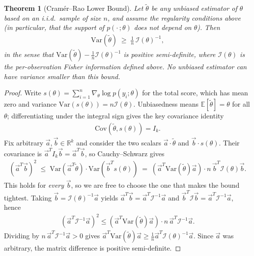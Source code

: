 \documentclass[11pt]{article}
\theoremstyle{definition}
\theoremstyle{plain}
\newtheorem{theorem}{Theorem}[section]
\theoremstyle{remark}
\begin{document}
\begin{theorem}[Cramér--Rao Lower Bound]
    Let $\tilde{\theta}$ be any unbiased estimator of $\theta$ based on an i.i.d.\ sample of size $n$, and assume the regularity conditions above (in particular, that the support of $p(\cdot\,;\theta)$ does not depend on $\theta$). Then
    \begin{align}
        \mathrm{Var}(\tilde{\theta}) \;\geq\; \frac{1}{n}\,\mathcal{I}(\theta)^{-1},
    \end{align}
    in the sense that $\mathrm{Var}(\tilde{\theta}) - \frac{1}{n}\mathcal{I}(\theta)^{-1}$ is positive semi-definite, where $\mathcal{I}(\theta)$ is the \emph{per-observation} Fisher information defined above. No unbiased estimator can have variance smaller than this bound.
\end{theorem}
\begin{proof}
    Write $s(\theta) = \sum_{i=1}^n \nabla_\theta \log p(y_i;\theta)$ for the total score, which has mean zero and variance $\mathrm{Var}(s(\theta)) = n\mathcal{I}(\theta)$. Unbiasedness means $\mathbb{E}[\tilde{\theta}] = \theta$ for all $\theta$; differentiating under the integral sign gives the key covariance identity
    \begin{align}
        \mathrm{Cov}(\tilde{\theta}, s(\theta)) = I_k.
    \end{align}
    Fix arbitrary $\vec{a}, \vec{b} \in \mathbb{R}^k$ and consider the two scalars $\vec{a}\cdot\tilde{\theta}$ and $\vec{b}\cdot s(\theta)$. Their covariance is $\vec{a}^TI_k\vec{b} = \vec{a}^T\vec{b}$, so Cauchy--Schwarz gives
    \begin{align}
        (\vec{a}^T\vec{b})^2 \;\leq\; \mathrm{Var}(\vec{a}^T\tilde{\theta})\cdot \mathrm{Var}(\vec{b}^Ts(\theta)) \;=\; \left(\vec{a}^T\mathrm{Var}(\tilde{\theta})\vec{a}\right)\cdot n\,\vec{b}^T\mathcal{I}(\theta)\vec{b}.
    \end{align}
    This holds for \emph{every} $\vec{b}$, so we are free to choose the one that makes the bound tightest. Taking $\vec{b} = \mathcal{I}(\theta)^{-1}\vec{a}$ yields $\vec{a}^T\vec{b} = \vec{a}^T\mathcal{I}^{-1}\vec{a}$ and $\vec{b}^T\mathcal{I}\vec{b} = \vec{a}^T\mathcal{I}^{-1}\vec{a}$, hence
    \begin{align}
        \left(\vec{a}^T\mathcal{I}^{-1}\vec{a}\right)^2 \leq \left(\vec{a}^T\mathrm{Var}(\tilde{\theta})\vec{a}\right)\cdot n\,\vec{a}^T\mathcal{I}^{-1}\vec{a}.
    \end{align}
    Dividing by $n\,\vec{a}^T\mathcal{I}^{-1}\vec{a} > 0$ gives $\vec{a}^T\mathrm{Var}(\tilde{\theta})\vec{a} \geq \frac{1}{n}\vec{a}^T\mathcal{I}(\theta)^{-1}\vec{a}$. Since $\vec{a}$ was arbitrary, the matrix difference is positive semi-definite.
\end{proof}
\end{document}
